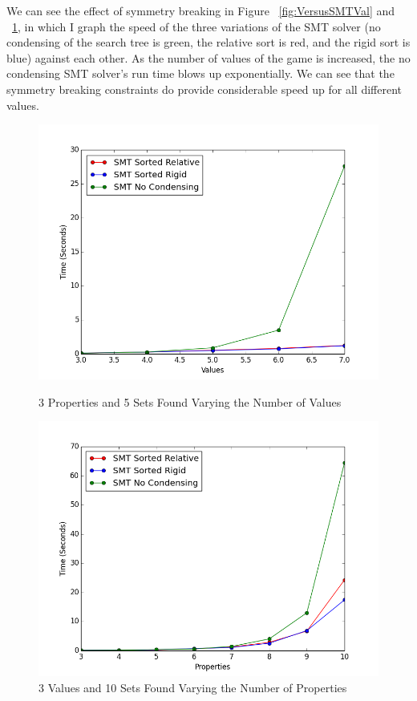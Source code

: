 \documentclass[pageno]{jpaper}
\begin{document}
We can see the effect of symmetry breaking in Figure ~\ref{fig:VersusSMTVal} and ~\ref{fig:VersusSMTProp}, in which I graph the speed of the three variations of the SMT solver (no condensing of the search tree is green, the relative sort is red, and the rigid sort is blue) against each other. As the number of values of the game is increased, the no condensing SMT solver's run time blows up exponentially. We can see that the symmetry breaking constraints do provide considerable speed up for all different values. 

\begin{figure}[htbb]
\begin{minipage}[b]{0.5\linewidth}
\centering
\includegraphics[width=.75\linewidth]{VersusSMTVAL-v34567p3n5.png}
\caption{3 Properties and 5 Sets Found Varying the Number of Values}
\label{fig:VersusSMTVal}
\end{minipage}
\hspace{0.5cm}
\begin{minipage}[b]{0.5\linewidth}
\centering
\includegraphics[width=.75\linewidth]{VersusSMTPROP-v3p345678910n5.png}
\caption{3 Values and 10 Sets Found Varying the Number of Properties}
\label{fig:VersusSMTProp}
\end{minipage}
\end{figure}
\end{document}
